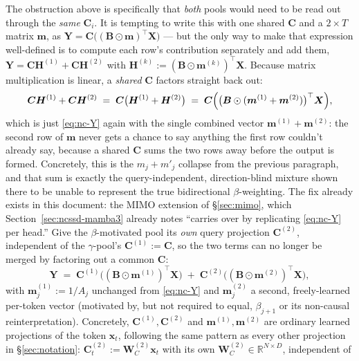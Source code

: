 \documentclass[11pt,a4paper]{article}
\begin{document}
The obstruction above is specifically that \emph{both} pools would
need to be read out through the \emph{same} $\bm{C}_i$. It is tempting
to write this with one shared $\bm{C}$ and a $2\times T$ matrix
$\bm{m}$, as $\bm{Y}=\bm{C}\bigl((\bm{B}\odot\bm{m})^\top\bm{X}\bigr)$
--- but the only way to make that expression well-defined is to
compute each row's contribution separately and add them,
$\bm{Y} = \bm{C}\bm{H}^{(1)} + \bm{C}\bm{H}^{(2)}$ with
$\bm{H}^{(k)} := (\bm{B}\odot\bm{m}^{(k)})^\top\bm{X}$. Because
matrix multiplication is linear, a \emph{shared} $\bm{C}$ factors
straight back out:
\begin{equation}
  \bm{C}\bm{H}^{(1)} + \bm{C}\bm{H}^{(2)}
  \;=\; \bm{C}\bigl(\bm{H}^{(1)}+\bm{H}^{(2)}\bigr)
  \;=\; \bm{C}\Bigl(\bigl(\bm{B}\odot(\bm{m}^{(1)}+\bm{m}^{(2)})\bigr)^\top\bm{X}\Bigr),
\end{equation}
which is just \eqref{eq:nc-Y} again with the single combined vector
$\bm{m}^{(1)}+\bm{m}^{(2)}$: the second row of $\bm{m}$ never gets a
chance to say anything the first row couldn't already say, because a
shared $\bm{C}$ sums the two rows away before the output is formed.
Concretely, this is the $m_j+m'_j$ collapse from the previous
paragraph, and that sum is exactly the query-independent,
direction-blind mixture shown there to be unable to represent the
true bidirectional $\beta$-weighting. The fix already exists in this
document: the MIMO extension of \S\ref{sec:mimo}, which
Section~\ref{sec:ncssd-mamba3} already notes ``carries over by
replicating \eqref{eq:nc-Y} per head.'' Give the $\beta$-motivated
pool its \emph{own} query projection $\bm{C}^{(2)}$, independent of
the $\gamma$-pool's $\bm{C}^{(1)}:=\bm{C}$, so the two terms can no
longer be merged by factoring out a common $\bm{C}$:
\begin{equation}\label{eq:vssd-2pool}
  \boxed{\;\bm{Y} \;=\; \bm{C}^{(1)}\bigl((\bm{B}\odot\bm{m}^{(1)})^\top\bm{X}\bigr)
        \;+\; \bm{C}^{(2)}\bigl((\bm{B}\odot\bm{m}^{(2)})^\top\bm{X}\bigr),\;}
\end{equation}
with $\bm{m}^{(1)}_j := 1/A_j$ unchanged from \eqref{eq:nc-Y} and
$\bm{m}^{(2)}_j$ a second, freely-learned per-token vector (motivated
by, but not required to equal, $\beta_{j+1}$ or its non-causal
reinterpretation). Concretely, $\bm{C}^{(1)},\bm{C}^{(2)}$ and
$\bm{m}^{(1)},\bm{m}^{(2)}$ are ordinary learned projections of the
token $\bm{x}_t$, following the same pattern as every other projection
in \S\ref{sec:notation}: $\bm{C}^{(2)}_t := \bm{W}_C^{(2)}\bm{x}_t$
with its own $\bm{W}_C^{(2)}\in\mathbb{R}^{N\times D}$, independent of
\end{document}
